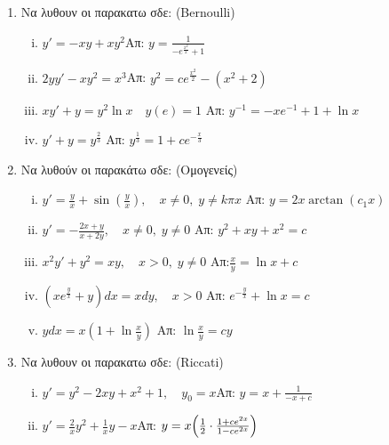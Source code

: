 \begin{enumerate}
\item Να λυθουν οι παρακατω σδε: (\textlatin{Bernoulli})

\begin{enumerate}[i)]

\item $y'=-xy+xy^2$\hfill Απ: $y=\frac{1}{-e^{\frac{x^2}{2}}+1}$
\item $2yy'-xy^2=x^3$\hfill Απ: $y^2=ce^{\frac{x^2}{2}}-(x^2+2)$
\item $xy'+y=y^{2}\ln x \quad y(e)=1$ \hfill Απ: $y^{-1}=-xe^{-1}+1+\ln x$
\item $y'+y=y^{\frac{2}{3}}$ \hfill Απ: $y^{\frac{1}{3}}=1+ce^{-\frac{x}{3}}$
\end{enumerate}

\item Να λυθούν οι παρακάτω σδε: (Ομογενείς)

\begin{enumerate}[i)]
  \item $y'=\frac{y}{x}+\sin(\frac{y}{x}), \quad x\neq 0,\; y\neq k\pi x$ \hfill Απ: $y=2x\arctan(c_{1}x)$
  \item $y'=-\frac{2x+y}{x+2y}, \quad x\neq 0,\; y\neq 0$  \hfill Απ: $y^{2}+xy+x^{2}=c$
  \item $x^{2}y'+y^{2}=xy, \quad x>0,\; y\neq 0$ \hfill Απ:$\frac{x}{y}=\ln x+c$
  \item $(xe^{\frac{y}{x}}+y)dx=xdy, \quad x>0$ \hfill Απ: $e^{-\frac{y}{x}}+\ln x =c$
  \item $ydx=x(1+\ln \frac{x}{y})$ \hfill Απ: $\ln \frac{x}{y}=cy$
\end{enumerate}

\item Να λυθουν οι παρακατω σδε: (\textlatin{Riccati})

\begin{enumerate}[i)]
\item $y'=y^2-2xy+x^2+1,\quad y_0=x$\hfill Απ: $y=x+\frac{1}{-x+c}$
\item $y'=\frac{2}{x}y^2+\frac{1}{x}y-x$\hfill Απ: $y=x\Bigl(\frac{1}{2}\cdot\frac{1+ce^{2x}}{1-ce^{2x}}\Bigr)$

\end{enumerate}

\end{enumerate}


